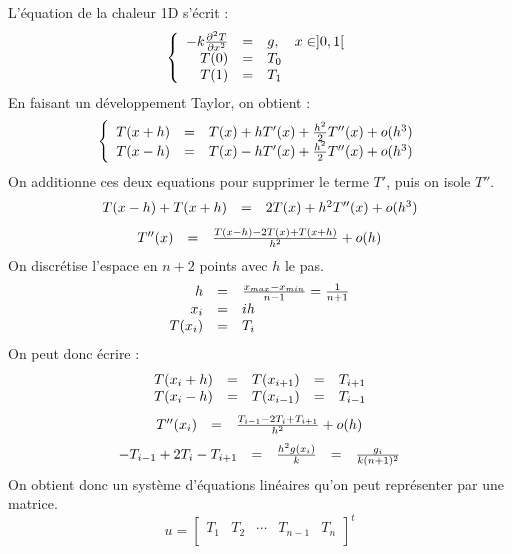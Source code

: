 \documentclass{article}
\begin{document}
L'équation de la chaleur 1D s'écrit :
\[
	\left \{
	\begin{array}{r c l}
		-k \frac{\partial^2 T}{\partial x^2} & = & g,\quad x \in ]0,1[ \\
		T(0) & = & T_0 \\
		T(1) & = & T_1 \\
	\end{array}
	\right .
\]
En faisant un développement Taylor, on obtient :
\[
	\left \{
	\begin{array}{r c l}
		T(x+h) & = & T(x) + hT'(x) + \frac{h^2}{2} T''(x) + o(h^3)\\
		T(x-h) & = & T(x) - hT'(x) + \frac{h^2}{2} T''(x) + o(h^3)\\
	\end{array}
	\right .
\]
On additionne ces deux equations pour supprimer le terme $T'$, puis on isole $T''$.
\[
	\begin{array}{r c l}
		T(x-h)+T(x+h) & = & 2T(x) + h^2 T''(x) + o(h^3)\\
	\end{array}
\]
\[
	\begin{array}{r c l}
		T''(x) & = & \frac{T(x-h) - 2T(x) + T(x+h)}{h^2}  + o(h)\\
	\end{array}
\]
On discrétise l'espace en $n+2$ points avec $h$ le pas.
\[
	\begin{array}{r c l}
	h & = & \frac{x_{max} - x_{min}}{n-1} = \frac{1}{n+1} \\
	x_i & = & ih \\
	T(x_i) & = & T_i \\
	\end{array}
\]
On peut donc écrire :
\[
	\begin{array}{r c c c l}
	T(x_i + h) & = & T(x_{i+1}) & = & T_{i+1} \\
	T(x_i - h) & = & T(x_{i-1}) & = & T_{i-1} \\
	\end{array}
\]
\[
	\begin{array}{r c l}
		T''(x_i) & = & \frac{T_{i-1} - 2T_i + T_{i+1}}{h^2}  + o(h)\\
	\end{array}
\]
\[
	\begin{array}{r c c c l}
		-T_{i-1} + 2T_i - T_{i+1} & = & \frac{h^2g(x_i)}{k} & = & \frac{g_i}{k(n+1)^2}\\
	\end{array}
\]
On obtient donc un système d'équations linéaires qu'on peut représenter par une matrice.
\[
	u = 
	\begin{bmatrix}
		T_1 & T_2 & \cdots & T_{n-1} & T_n \\
	\end{bmatrix}^t
\]
\end{document}
